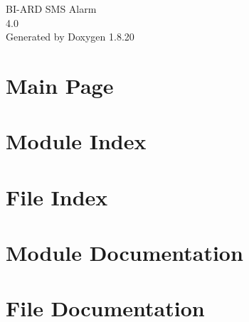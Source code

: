 \let\mypdfximage\pdfximage\def\pdfximage{\immediate\mypdfximage}\documentclass[twoside]{book}
\newcommand{\+}{\discretionary{\mbox{\scriptsize$\hookleftarrow$}}{}{}}
\newcommand{\clearemptydoublepage}{%
  \newpage{\pagestyle{empty}\cleardoublepage}%
}
\begin{document}
\hypersetup{pageanchor=false,
             bookmarksnumbered=true,
             pdfencoding=unicode
            }
\begin{titlepage}
\vspace*{7cm}
\begin{center}%
{\Large B\+I-\/\+A\+RD S\+MS Alarm \\[1ex]\large 4.\+0 }\\
\vspace*{1cm}
{\large Generated by Doxygen 1.8.20}\\
\end{center}
\end{titlepage}
\clearemptydoublepage
{}
\tableofcontents
\clearemptydoublepage
{}
\hypersetup{pageanchor=true}

\chapter{Main Page}
\label{index}\hypertarget{index}{}
\chapter{Module Index}

\chapter{File Index}

\chapter{Module Documentation}













\chapter{File Documentation}





\backmatter
\newpage
{}
\clearemptydoublepage
{}
\printindex
\end{document}
